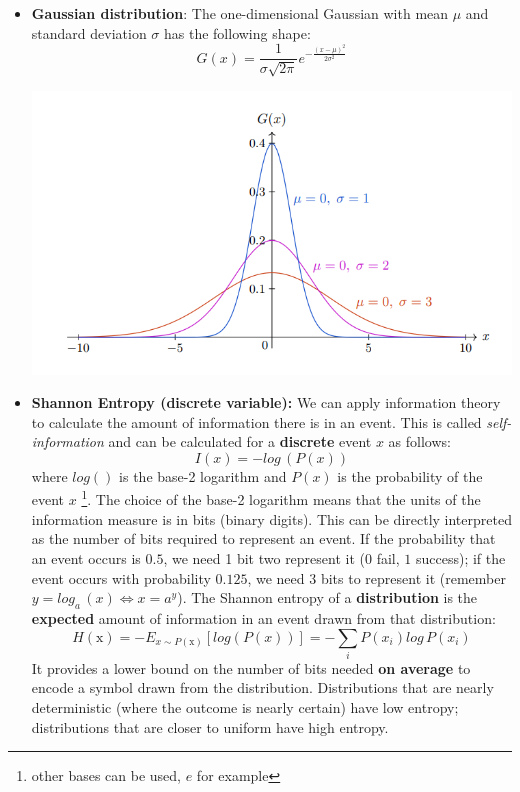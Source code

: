 \begin{itemize}
    \item \textbf{Gaussian distribution}: The one-dimensional Gaussian with mean $\mu$ and standard deviation $\sigma$ has the following shape:
    \[G(x) = \frac{1}{\sigma \sqrt{2\pi}}e^{-\frac{(x-\mu)^{2}}{2\sigma^{2}}}\]
    \begin{center}
        \includegraphics[]{images/Gaussian.png}
    \end{center}

    \item \textbf{Shannon Entropy (discrete variable):} 
    We can apply information theory to calculate the amount of information there is in an event. This is called \textit{self-information} and can be calculated for a \textbf{discrete} event $x$ as follows:
    \[I(x) = -log\,(P(x))\]
    where $log()$ is the base-2 logarithm and $P(x)$ is the probability of the event $x$ \footnote{other bases can be used, $e$ for example}.
    \newline\newline
    The choice of the base-2 logarithm means that the units of the information measure is in bits (binary digits). This can be directly interpreted as the number of bits required to represent an event. If the probability that an event occurs is $0.5$, we need 1 bit two represent it ($0$ fail, $1$ success); if the event occurs with probability $0.125$, we need $3$ bits to represent it (remember $y = log_a\,(x) \iff x = a^y$).
    \newline\newline
    The Shannon entropy of a \textbf{distribution} is the \textbf{expected} amount of information in an event drawn from that distribution:
    \[H(\text{x}) = - E_{x \sim P(\text{x})}[log(P(x))] = -\sum_i P(x_i) log\,P(x_i)\]
    It provides a lower bound on the number of bits needed \textbf{on average} to encode a symbol drawn from the distribution.\newline\newline
    Distributions that are nearly deterministic (where the outcome is nearly certain) have low entropy; distributions that are closer to uniform have high entropy.
    


\end{itemize}
